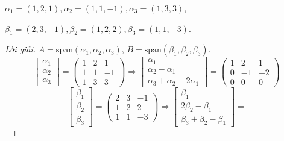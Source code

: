 \documentclass[class=linear-algebra,crop=false]{standalone}
\begin{document}
\begin{exercise}$\alpha_{1} = (1,2,1), \alpha_{2} = (1,1,-1), \alpha_{3} = (1,3,3)$,
    \par $\beta_{1} = (2,3,-1), \beta_{2} = (1,2,2), \beta_{3} = (1,1,-3)$.
\end{exercise}

\begin{proof}[Lời giải]$A = \text{span}(\alpha_{1},\alpha_{2},\alpha_{3})$, $B = \text{span}(\beta_{1},\beta_{2},\beta_{3})$.
    \[
        \begin{bmatrix}
            \alpha_{1} \\
            \alpha_{2} \\
            \alpha_{3}
        \end{bmatrix}=
        \begin{pmatrix}
            1 & 2 & 1  \\
            1 & 1 & -1 \\
            1 & 3 & 3
        \end{pmatrix}
        \Longrightarrow
        \begin{bmatrix}
            \alpha_{1}            \\
            \alpha_{2}-\alpha_{1} \\
            \alpha_{3}+\alpha_{2}-2\alpha_{1}
        \end{bmatrix}=
        \begin{pmatrix}
            1 & 2  & 1  \\
            0 & -1 & -2 \\
            0 & 0  & 0
        \end{pmatrix}
    \]
    \[
        \begin{bmatrix}
            \beta_{1} \\
            \beta_{2} \\
            \beta_{3}
        \end{bmatrix}=
        \begin{pmatrix}
            2 & 3 & -1 \\
            1 & 2 & 2  \\
            1 & 1 & -3
        \end{pmatrix}
        \Longrightarrow
        \begin{bmatrix}
            \beta_{1}            \\
            2\beta_{2}-\beta_{1} \\
            \beta_{3}+\beta_{2}-\beta_{1}
        \end{bmatrix}=
\]
\end{proof}
\end{document}
